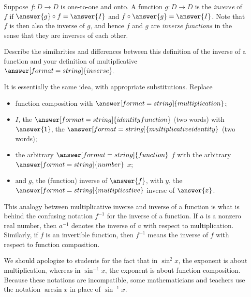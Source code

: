 \documentclass{ximera}
\begin{document}
\begin{definition}
Suppose $f:D\rightarrow D$ is one-to-one and onto.  A function $g:D\rightarrow D$ is the \emph{inverse} of $f$ if $\answer{g}\circ f = \answer{I}$ and $f\circ \answer{g} = \answer{I}$.  Note that $f$ is then also the inverse of $g$, and hence $f$ and $g$ are \emph{inverse functions} in the sense that they are inverses of each other.  
\end{definition}

\begin{question}
Describe the similarities and differences between this definition of the inverse of a function and your definition of multiplicative $\answer[format=string]{inverse}$.  
\begin{solution}
It is essentially the same idea, with appropriate substitutions.  Replace 
\begin{itemize}
\item function composition with $\answer[format=string]{multiplication}$; 
\item $I$, the $\answer[format=string]{identity function}$ (two words) with $\answer{1}$, 
    the $\answer[format=string]{multiplicative identity}$ (two words); 
\item the arbitrary $\answer[format=string]{function}$ $f$ with the arbitrary $\answer[format=string]{number}$ $x$;
\item and $g$, the (function) inverse of $\answer{f}$, with $y$, 
    the $\answer[format=string]{multiplicative}$ inverse of $\answer{x}$.  
\end{itemize}
\end{solution}
\end{question}

\begin{remark}
This analogy between multiplicative inverse and inverse of a function is what is behind the confusing notation $f^{-1}$ for the inverse of a function.  If $a$ is a nonzero real number, then $a^{-1}$ denotes the inverse of $a$ with respect to multiplication.  Similarly, if $f$ is an invertible function, then $f^{-1}$ means the inverse of $f$ with respect to function composition. 

We should apologize to students for the fact that in $\sin^2 x$, the exponent is about multiplication, whereas in $\sin^{-1} x$, the exponent is about function composition.  Because these notations are incompatible, some mathematicians and teachers use the notation $\arcsin x$ in place of $\sin^{-1} x$.  
\end{remark}
\end{document}
